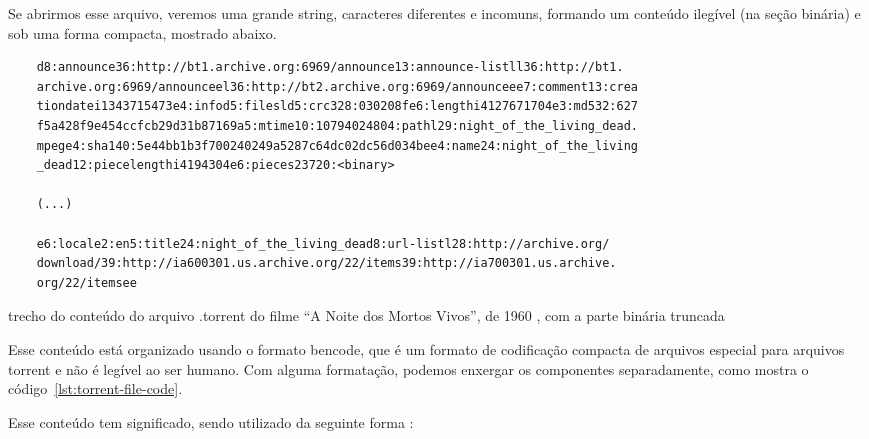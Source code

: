 Se abrirmos esse arquivo, veremos uma grande \gls{string}, caracteres diferentes e
incomuns, formando um conteúdo ilegível (na seção binária) e sob uma forma compacta,
mostrado abaixo.

\begin{listing}[H]
    \begin{verbatim}
    d8:announce36:http://bt1.archive.org:6969/announce13:announce-listll36:http://bt1.
    archive.org:6969/announceel36:http://bt2.archive.org:6969/announceee7:comment13:crea
    tiondatei1343715473e4:infod5:filesld5:crc328:030208fe6:lengthi4127671704e3:md532:627
    f5a428f9e454ccfcb29d31b87169a5:mtime10:10794024804:pathl29:night_of_the_living_dead.
    mpege4:sha140:5e44bb1b3f700240249a5287c64dc02dc56d034bee4:name24:night_of_the_living
    _dead12:piecelengthi4194304e6:pieces23720:<binary>

    (...)

    e6:locale2:en5:title24:night_of_the_living_dead8:url-listl28:http://archive.org/
    download/39:http://ia600301.us.archive.org/22/items39:http://ia700301.us.archive.
    org/22/itemsee
    \end{verbatim}

    \caption{trecho do conteúdo do arquivo .torrent do filme ``A Noite dos Mortos
    Vivos'', de 1960 \cite{torrent-file}, com a parte binária truncada}
    \label{lst:torrent-file-raw}
\end{listing}

Esse conteúdo está organizado usando o formato \gls{bencode}, que é um formato de
codificação compacta de arquivos especial para arquivos \gls*{torrent} e não é legível
ao ser humano. Com alguma formatação, podemos enxergar os componentes separadamente,
como mostra o código~\ref{lst:torrent-file-code}.

Esse conteúdo tem significado, sendo utilizado da seguinte forma
\cite{wikitheory:bencoding}:


